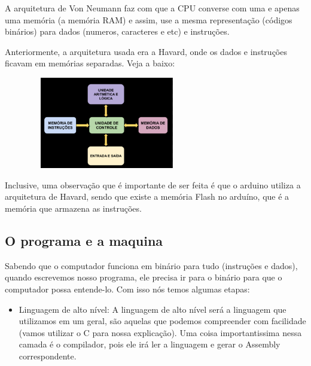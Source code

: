 \documentclass[12pt,a4paper]{report}
\begin{document}
	A arquitetura de Von Neumann faz com que a CPU converse com uma e apenas uma memória (a memória RAM) e assim, use a mesma representação (códigos binários) para dados (numeros, caracteres e etc) e instruções.
	
	Anteriormente, a arquitetura usada era a Havard, onde os dados e instruções ficavam em memórias separadas. Veja a baixo:
	
	\begin{center}
		
		\includegraphics[width=9cm,height=4cm,keepaspectratio=false]{imagens-teoria/havard.png}
		
	\end{center}
	
	Inclusive, uma observação que é importante de ser feita é que o arduino utiliza a arquitetura de Havard, sendo que existe a memória Flash no arduíno, que é a memória que armazena as instruções.
	
	\subsection{O programa e a maquina}
	
	Sabendo que o computador funciona em binário para tudo (instruções e dados), quando escrevemos nosso programa, ele precisa ir para o binário para que o computador possa entende-lo. Com isso nós temos algumas etapas:
	
	\begin{itemize}
		
		\item Linguagem de alto nível: A linguagem de alto nível será a linguagem que utilizamos em um geral, são aquelas que podemos compreender com facilidade (vamos utilizar o C para nossa explicação). Uma coisa importantissima nessa camada é o compilador, pois ele irá ler a linguagem e gerar o Assembly correspondente.
	\end{itemize}
	
\end{document}
